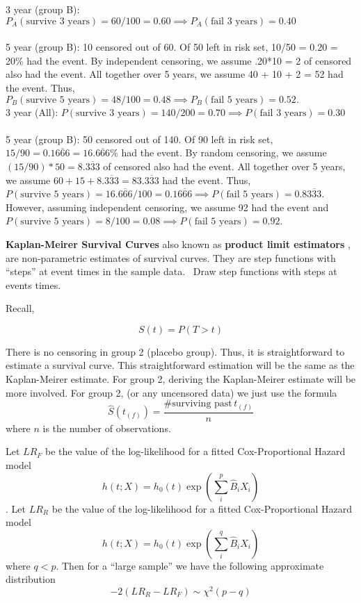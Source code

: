 \documentclass{article}
\begin{document}
3 year (group B): $P_A(\text{survive 3 years})= 60/100 = 0.60 \implies P_A(\text{fail 3 years}) = 0.40$ \\ \\
5 year (group B): 10 censored out of 60. Of 50 left in risk set, 10/50 = 0.20 = 20\% had the event. By independent censoring, we assume .20*10 = 2 of censored also had the event. All together over 5 years, we assume 40 + 10 + 2 = 52 had the event. Thus, $P_B(\text{survive 5 years})= 48/100 = 0.48 \implies P_B(\text{fail 5 years}) = 0.52.$ \\


3 year (All): $P(\text{survive 3 years})= 140/200 = 0.70 \implies P(\text{fail 3 years}) = 0.30$ \\ \\
5 year (group B): 50 censored out of 140. Of 90 left in risk set, $15/90 = 0.1\overline{666} = 16.\overline{666}\%$ had the event. By random censoring, we assume $(15/90)*50 = 8.\overline{333}$ of censored also had the event. All together over 5 years, we assume $60 + 15 + 8.\overline{333} = 83.\overline{333}$ had the event. Thus, $P(\text{survive 5 years})= 16.\overline{666}/100 = 0.1\overline{666} \implies P(\text{fail 5 years}) = 0.8\overline{333}$. However, assuming independent censoring, we assume 92 had the event and  $P(\text{survive 5 years})= 8/100 = 0.08 \implies P(\text{fail 5 years}) = 0.92$. 




 \textbf{Kaplan-Meirer Survival Curves } also known as \textbf{ product limit estimators }, are non-parametric estimates of survival curves. They are step functions with ``steps'' at event times in the sample data. 
\NTS \, Draw step functions with steps at events times. 

 Recall, 

\[
S(t) = P(T>t)
\] 

There is no censoring in group 2 (placebo group). Thus, it is straightforward to estimate a survival curve. This straightforward estimation will be the same as the Kaplan-Meirer estimate. For group 2, deriving the Kaplan-Meirer estimate will be more involved. For group 2, (or any uncensored data) we just use the formula
\[
\hat{S}(t_{(f)}) = \frac{\# \text{surviving past} \, t_{(f)}}{n}  
\] 
where $n$ is the number of observations. 


 Let $LR_F$ be the value of the log-likelihood for a fitted Cox-Proportional Hazard model
\[ h(t;X) = h_0(t) \exp(\sum_i^p \hat{B}_iX_i) \].
Let $LR_R$ be the value of the log-likelihood for a fitted Cox-Proportional Hazard model
\[ h(t;X) = h_0(t) \exp(\sum_i^q \hat{B}_iX_i) \]
where $q<p$.
Then for a ``large sample'' we have the following approximate distribution
\[
-2(LR_R - LR_F) \sim \chi^2(p-q)
\]
\end{document}
